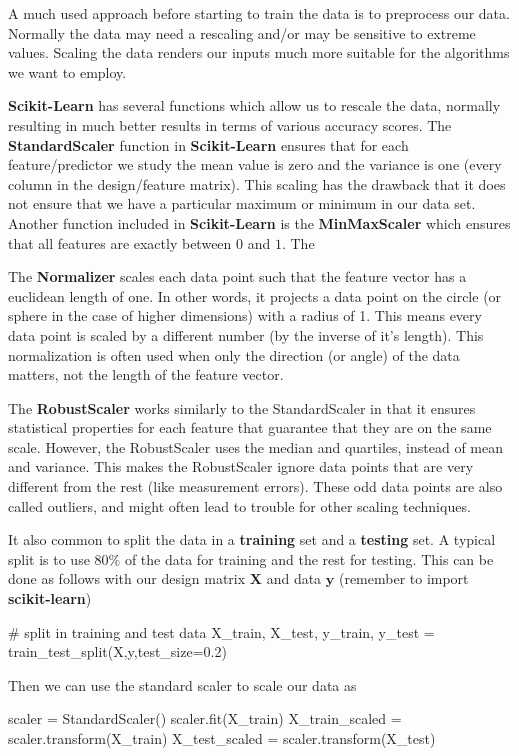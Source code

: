 \documentclass[%
oneside,                 %
final,                   %
10pt]{article}
\newenvironment{doconceexercise}{}{}
\newcounter{doconceexercisecounter}
\begin{document}
\begin{doconceexercise}



A much used approach before starting to train the data is  to preprocess our
data. Normally the data may need a rescaling and/or may be sensitive
to extreme values. Scaling the data renders our inputs much more
suitable for the algorithms we want to employ.

\textbf{Scikit-Learn} has several functions which allow us to rescale the
data, normally resulting in much better results in terms of various
accuracy scores.  The \textbf{StandardScaler} function in \textbf{Scikit-Learn}
ensures that for each feature/predictor we study the mean value is
zero and the variance is one (every column in the design/feature
matrix).  This scaling has the drawback that it does not ensure that
we have a particular maximum or minimum in our data set. Another
function included in \textbf{Scikit-Learn} is the \textbf{MinMaxScaler} which
ensures that all features are exactly between $0$ and $1$. The


The \textbf{Normalizer} scales each data
point such that the feature vector has a euclidean length of one. In other words, it
projects a data point on the circle (or sphere in the case of higher dimensions) with a
radius of 1. This means every data point is scaled by a different number (by the
inverse of it’s length).
This normalization is often used when only the direction (or angle) of the data matters,
not the length of the feature vector.

The \textbf{RobustScaler} works similarly to the StandardScaler in that it
ensures statistical properties for each feature that guarantee that
they are on the same scale. However, the RobustScaler uses the median
and quartiles, instead of mean and variance. This makes the
RobustScaler ignore data points that are very different from the rest
(like measurement errors). These odd data points are also called
outliers, and might often lead to trouble for other scaling
techniques.


It also common to split the data in a \textbf{training} set and a \textbf{testing} set. A typical split is to use $80\%$ of the data for training and the rest
for testing. This can be done as follows with our design matrix $\bm{X}$ and data $\bm{y}$ (remember to import \textbf{scikit-learn})
\begin{print}
# split in training and test data
X_train, X_test, y_train, y_test = train_test_split(X,y,test_size=0.2)
\end{print}
Then we can use the standard scaler to scale our data as
\begin{print}
scaler = StandardScaler()
scaler.fit(X_train)
X_train_scaled = scaler.transform(X_train)
X_test_scaled = scaler.transform(X_test)
\end{print}



\end{doconceexercise}
\end{document}
